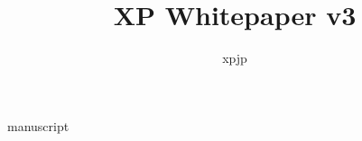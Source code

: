 \documentclass[a4paper]{jsarticle}
\title {XP Whitepaper v3}
\author {xpjp}
\date {}
\begin{document}
 {manuscript}
\end{document}
